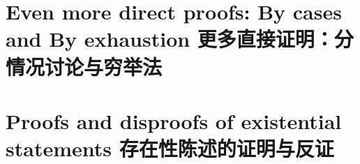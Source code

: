\newpage

\section[By cases and By exhaustion]{Even more direct proofs: By cases and By exhaustion 更多直接证明：分情况讨论与穷举法}





\newpage

\section[Existential statements]{Proofs and disproofs of existential statements 存在性陈述的证明与反证}






%
%

